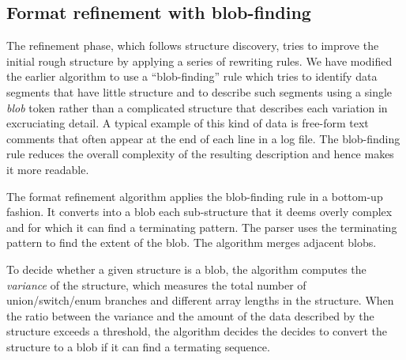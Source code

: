 \subsection{Format refinement with blob-finding}
The refinement phase, which follows structure discovery, tries to
improve the initial rough structure by applying a series of
rewriting rules.  We have modified the earlier algorithm to use a 
``blob-finding'' rule which tries to identify data segments that have
little structure and to describe such segments using a single
\textit{blob} token rather than a complicated structure that describes
each variation in excruciating detail.  A typical example of this kind
of data is free-form text comments that often appear at the end of
each line in a log file.  The blob-finding rule reduces the overall
complexity of the resulting description and hence makes it more
readable.

The format refinement algorithm applies the blob-finding rule 
in a bottom-up fashion. It converts into a blob each sub-structure
that it deems overly complex and for which it can find a terminating pattern. 
The \pads{} parser uses the terminating pattern to
find the extent of the blob. The algorithm merges adjacent blobs.

To decide whether a given structure is a blob, 
the algorithm computes the {\em variance} of the structure, which
measures the total number of union/switch/enum
branches and different array lengths in the 
structure. When the ratio between the variance and the amount of the data
described by the structure exceeds a threshold, the algorithm decides
the decides to convert the structure to a blob if it can find a
termating sequence.
